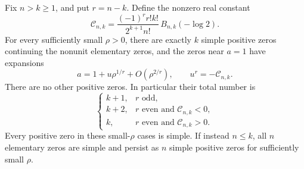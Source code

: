 \begin{theorem}[Fractional-power splitting at $\rho=0$]\label{lerchbd:thm:weak}
Fix $n>k\ge1$, and put $r=n-k$. Define the nonzero real constant
\begin{equation}\label{lerchbd:eq:splitC}
 \mathcal C_{n,k}=
 \frac{(-1)^r r!k!}{2^{k+1}n!}\,B_{n,k}(-\log2).
\end{equation}
For every sufficiently small $\rho>0$, there are exactly $k$ simple positive zeros continuing the nonunit elementary zeros, and the zeros near $a=1$ have expansions
\begin{equation}\label{lerchbd:eq:puiseux}
 a=1+u\rho^{1/r}+O(\rho^{2/r}),\qquad u^r=-\mathcal C_{n,k}.
\end{equation}
There are no other positive zeros. In particular their total number is
\begin{equation}\label{lerchbd:eq:weak-count}
 \begin{cases}
 k+1,&r\text{ odd},\\
 k+2,&r\text{ even and }\mathcal C_{n,k}<0,\\
 k,&r\text{ even and }\mathcal C_{n,k}>0.
 \end{cases}
\end{equation}
Every positive zero in these small-$\rho$ cases is simple. If instead $n\le k$, all $n$ elementary zeros are simple and persist as $n$ simple positive zeros for sufficiently small $\rho$.
\end{theorem}
